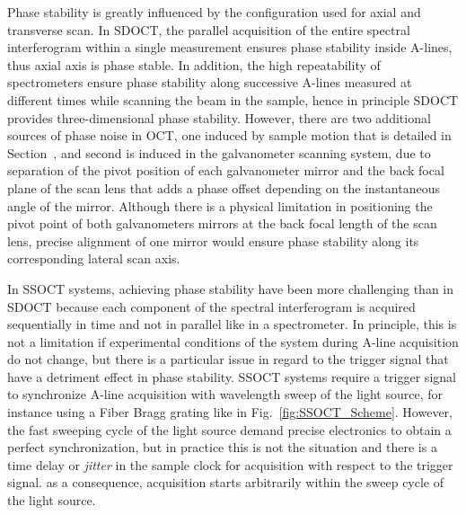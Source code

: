 Phase stability is greatly influenced by the configuration used for axial and transverse scan. In SDOCT, the parallel acquisition of the entire spectral interferogram within a single measurement ensures phase stability inside A-lines, thus axial axis is phase stable. In addition, the high repeatability of spectrometers ensure phase stability along successive A-lines measured at different times while scanning the beam in the sample, hence in principle SDOCT provides three-dimensional phase stability. However, there are two additional sources of phase noise in OCT, one induced by sample motion that is detailed in Section~\cite{sec:phaseStab}, and second is induced in the galvanometer scanning system, due to separation of the pivot position of each galvanometer mirror and the back focal plane of the scan lens that adds a phase offset depending on the instantaneous angle of the mirror. Although there is a physical limitation in positioning the pivot point of both galvanometers mirrors at the back focal length of the scan lens, precise alignment of one mirror would ensure phase stability along its corresponding lateral scan axis.

In SSOCT systems, achieving phase stability have been more challenging than in SDOCT because each component of the spectral interferogram is acquired sequentially in time and not in parallel like in a spectrometer. In principle, this is not a limitation if experimental conditions of the system during A-line acquisition do not change, but there is a particular issue in regard to the trigger signal that have a detriment effect in phase stability. SSOCT systems require a trigger signal to synchronize A-line acquisition with wavelength sweep of the light source, for instance using a Fiber Bragg grating like in Fig.~\ref{fig:SSOCT_Scheme}. However, the fast sweeping cycle of the light source demand precise electronics to obtain a perfect synchronization, but in practice this is not the situation and there is a time delay or \textit{jitter} in the sample clock for acquisition with respect to the trigger signal. as a consequence, acquisition starts arbitrarily within the sweep cycle of the light source.

